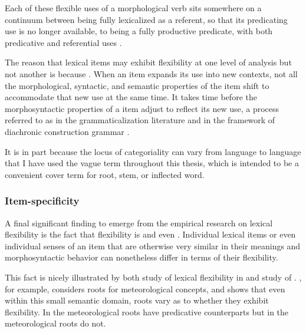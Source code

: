 \noindent Each of these flexible uses of a morphological verb sits somewhere on a continuum between being fully lexicalized as a referent, so that its predicating use is no longer available, to being a fully productive predicate, with both predicative and referential uses \parencite[413]{Mithun2000}.

The reason that lexical items may exhibit flexibility at one level of analysis but not another is because . When an item expands its use into new contexts, not all the morphological, syntactic, and semantic properties of the item shift to accommodate that new use at the same time. It takes time before the morphosyntactic properties of a item adjust to reflect its new use, a process referred to as  in the grammaticalization literature \parencite{DeSmet2012} and  in the framework of diachronic construction grammar \parencite[27]{HopperTraugott2003}.

It is in part because the locus of categoriality can vary from language to language that I have used the vague term  throughout this thesis, which is intended to be a convenient cover term for root, stem, or inflected word.

\subsubsection{Item-specificity}
\label{sec:2.3.2.4}

A final significant finding to emerge from the empirical research on lexical flexibility is the fact that flexibility is  and even . Individual lexical items or even individual senses of an item that are otherwise very similar in their meanings and morphosyntactic behavior can nonetheless differ in terms of their flexibility.

This fact is nicely illustrated by both  study of lexical flexibility in  and  study of . \textcite[163--164]{Mithun2017}, for example, considers roots for meteorological concepts, and shows that even within this small semantic domain, roots vary as to whether they exhibit flexibility. In  the meteorological roots have predicative counterparts but in  the meteorological roots do not.

